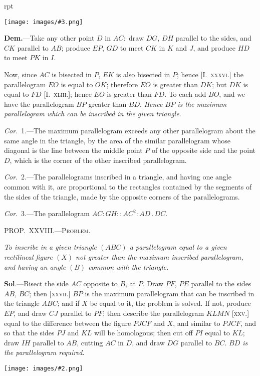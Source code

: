 \documentclass[oneside]{book}
\newcounter{wrapwidth}
\newcommand\mypropl[2]{
\bigskip\Needspace*{4\baselineskip}\begin{center}\textsc{#1}\end{center}
\hspace{\parindent}\emph{#2}\par\medskip
}
\newcommand\imgflow[3]{
\setcounter{wrapwidth}{#1}
\begin{wrapfigure}[#2]{r}{\value{wrapwidth}pt}
\begin{center}
\vspace{-0.3in}
\texttt{[image: images/\#3.png]}
\end{center}
\end{wrapfigure}
}
\newcommand\imgcent[2]{
\begin{center}
\texttt{[image: images/\#2.png]}
\end{center}
}
\begin{document}
\imgflow{140}{8}{f207}

\textbf{Dem.}---Take any other point $D$ in $AC:$ draw $DG$,
$DH$ parallel to the sides, and $CK$ parallel to $AB$;
produce $EP$, $GD$ to meet
$CK$ in $K$ and $J$, and produce $HD$ to meet $PK$ in $I$.

Now, since $AC$ is bisected
in $P$, $EK$ is also bisected
in $P$; hence [I.~\textsc{xxxvi.}] the
parallelogram $EO$ is equal
to $OK$; therefore $EO$ is
greater than $DK$; but $DK$ is equal to $FD$ [I.~\textsc{xliii.}];
hence $EO$ is greater than $FD$. To each add $BO$, and
we have the parallelogram $BP$ greater than $BD$.
\emph{Hence $BP$ is the maximum parallelogram which can be
inscribed in the given triangle}.

\emph{Cor}.~1.---The maximum parallelogram exceeds any
other parallelogram ab\-out the same angle in the triangle,
by the area of the similar parallelogram whose
diagonal is the line between the middle point $P$ of the
opposite side and the point $D$, which is the corner of
the other inscribed parallelogram.

\emph{Cor}.~2.---The parallelograms inscribed in a triangle,
and having one angle common with it, are proportional
to the rectangles contained by the segments of the
sides of the triangle, made by the opposite corners of
the parallelograms.

\emph{Cor}.~3.---The parallelogram $AC : GH :: AC^2 :
AD\,.\,DC$.

\mypropl{PROP\@.~XXVIII\@.---Problem.}{To inscribe in a given triangle $(ABC)$ a parallelogram
equal to a given rectilineal figure $(X)$ not greater than
the maximum inscribed parallelogram, and having an
angle $(B)$ common with the triangle.}

\textbf{Sol}.---Bisect the side $AC$ opposite to $B$, at $P$. Draw
$PF$, $PE$ parallel to the sides $AB$, $BC$; then [\textsc{xxvii}.] $BP$ is
the maximum parallelogram that can be inscribed in the
triangle $ABC$; and if $X$ be equal to it, the problem is
solved. If not, produce $EP$, and draw $CJ$ parallel to
$PF$; then describe the parallelogram $KLMN$ [\textsc{xxv.}]
equal to the difference between the figure $PJCF$ and
$X$, and similar to $PJCF$, and so that the sides $PJ$ and
$KL$ will be homologous; then cut off $PI$ equal to $KL$;
draw $IH$ parallel to $AB$, cutting $AC$ in $D$, and draw
$DG$ parallel to $BC$. \emph{$BD$ is the parallelogram required}.

\imgcent{200}{f208}
\end{document}
